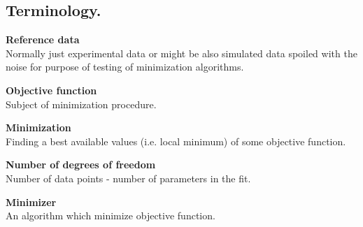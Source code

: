\subsection{Terminology.}

\noindent
{\bf Reference data} \\
Normally just experimental data or might be also simulated data
spoiled with the noise for purpose of testing of minimization algorithms.
\vspace*{1mm}

\noindent
{\bf Objective function} \\
Subject of minimization procedure.
\vspace*{1mm}

\noindent
{\bf Minimization} \\
Finding a best available values (i.e. local minimum) of some objective function. 
\vspace*{1mm}

\noindent
{\bf Number of degrees of freedom} \\
Number of data points - number of parameters in the fit.
\vspace*{1mm}

\noindent
{\bf Minimizer} \\
An algorithm which minimize objective function. 

